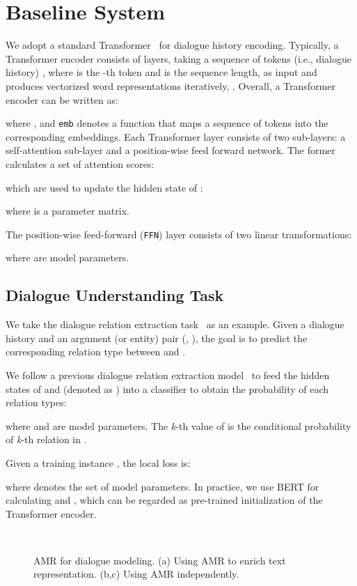 \documentclass[11pt,a4paper]{article}
\begin{document}
\section{Baseline System}
\label{sec:stdTransformer}
We adopt a standard Transformer~\cite{vaswani2017attention} for dialogue history encoding. 
Typically, a Transformer encoder consists of  layers, taking a sequence of tokens (i.e., dialogue history) , where  is the -th token and  is the sequence length, as input and produces vectorized word representations  iteratively, . 
Overall, a Transformer encoder can be written as:

where , and \texttt{emb} denotes a function that maps a sequence of tokens into the corresponding embeddings.
Each Transformer layer consists of two sub-layers: a self-attention sub-layer and a position-wise feed forward network.
The former calculates a set of attention scores:

which are used to update the hidden state of :

where  is a parameter matrix.

The position-wise feed-forward (\texttt{FFN}) layer consists of two  linear transformations:

where  are model parameters.

\subsection{Dialogue Understanding Task}
We take the dialogue relation extraction task~\cite{yu-2020-dialogue} as an example. 
Given a dialogue history  and an argument (or entity) pair (, ), the goal is to predict the corresponding relation type  between  and .

We follow a previous dialogue relation extraction model~\cite{Chen20Dialogue} to feed the hidden states of  and  (denoted as ) into a classifier to obtain the probability of each relation types:

where 
 and  are model parameters. The \textit{k}-th value of  is the conditional probability of \textit{k}-th relation in .

Given a training instance , the local loss is:

where  denotes the set of model parameters.
In practice, we use BERT \cite{devlin-etal-2019-bert} for calculating  and , which can be regarded as pre-trained initialization of the Transformer encoder.

\begin{figure*}[t!]
	\centering 
	 \hspace{0.15in}
	 \hspace{0.15in}
	\\
	\caption{AMR for dialogue modeling. (a) Using AMR to enrich text representation. (b,c) Using AMR independently.}
	\label{fig:model}
\end{figure*}
\end{document}
